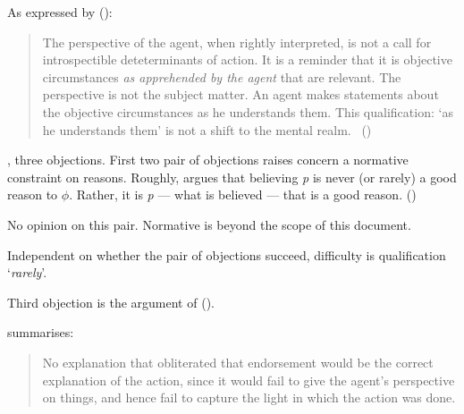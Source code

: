 \begin{note}
  As expressed by \citeauthor{Collins:1997wn} (\citeyear{Collins:1997wn}):
  \begin{quote}
    The perspective of the agent, when rightly interpreted, is not a call for introspectible deteterminants of action.
    It is a reminder that it is objective circumstances \emph{as apprehended by the agent} that are relevant.
    The perspective is not the subject matter.
    An agent makes statements about the objective circumstances as he understands them.
    This qualification: `as he understands them' is not a shift to the mental realm.%
    \mbox{ }\hfill\mbox{(\citeyear[120]{Collins:1997wn})}
  \end{quote}
\end{note}

\begin{note}
  \citeauthor{Dancy:2000aa}, three objections.
  First two pair of objections \citeauthor{Dancy:2000aa} raises concern a normative constraint on reasons.
  Roughly, \citeauthor{Dancy:2000aa} argues that believing \emph{p} is never (or rarely) a good reason to \(\phi\).
  Rather, it is \emph{p} --- what is believed --- that is a good reason.
  (\citeyear[107]{Dancy:2000aa})

  No opinion on this pair.
  Normative is beyond the scope of this document.

  Independent on whether the pair of objections succeed, difficulty is qualification `\emph{rarely}'.
\end{note}

\begin{note}
  Third objection is the argument of \citeauthor{Collins:1997wn} (\citeyear{Collins:1997wn}).

  \citeauthor{Dancy:2000aa} summarises:
  \begin{quote}
    No explanation that obliterated that endorsement would be the correct explanation of the action, since it would fail to give the agent’s perspective on things, and hence fail to capture the light in which the action was done.
    \citeyear[108]{Dancy:2000aa}
  \end{quote}
\end{note}

